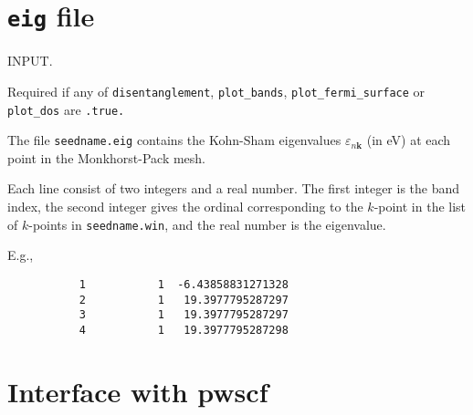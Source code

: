 %


\section{{\tt eig} file}

INPUT. 

Required if any of \verb#disentanglement#, \verb#plot_bands#,
   \verb#plot_fermi_surface# or \verb#plot_dos# are \verb#.true.#

The file \verb#seedname.eig# contains the Kohn-Sham eigenvalues
     $\varepsilon_{n\mathbf{k}}$ (in eV) at each point in the
     Monkhorst-Pack mesh.

Each line consist of two integers and a real number. The first integer
is the band index, the second integer gives the ordinal corresponding
to the $k$-point in the list of $k$-points in \verb#seedname.win#,
and the real number is the eigenvalue. 

E.g.,

\begin{verbatim}
           1           1  -6.43858831271328
           2           1   19.3977795287297
           3           1   19.3977795287297
           4           1   19.3977795287298
\end{verbatim}


\section{Interface with {\sc pwscf}}

